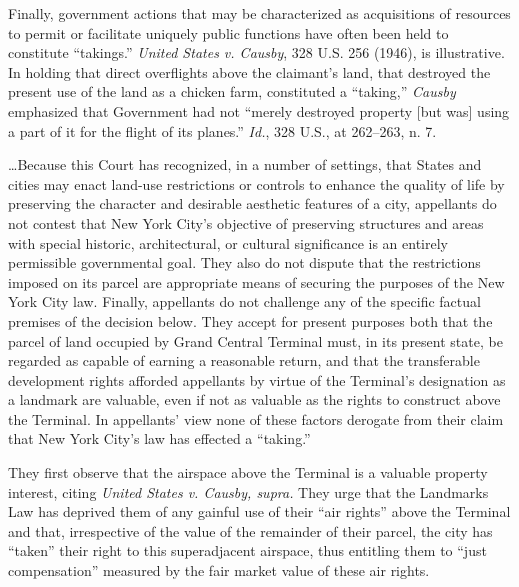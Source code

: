 Finally, government actions that may be characterized as acquisitions of
resources to permit or facilitate uniquely public functions have often been held
to constitute ``takings.'' \textit{United States v. Causby}, 328 U.S. 256
(1946), is illustrative. In holding that direct overflights above the claimant's
land, that destroyed the present use of the land as a chicken farm, constituted
a ``taking,'' \textit{Causby} emphasized that Government had not ``merely
destroyed property [but was] using a part of it for the flight of its planes.''
\textit{Id.}, 328 U.S., at 262--263, n. 7. 



\ldots Because this Court has recognized, in a number of settings, that States
and cities may enact land-use restrictions or controls to enhance the quality of
life by preserving the character and desirable aesthetic features of a city,
appellants do not contest that New York City's objective of preserving
structures and areas with special historic, architectural, or cultural
significance is an entirely permissible governmental goal. They also do not
dispute that the restrictions imposed on its parcel are appropriate means of
securing the purposes of the New York City law. Finally, appellants do not
challenge any of the specific factual premises of the decision below. They
accept for present purposes both that the parcel of land occupied by Grand
Central Terminal must, in its present state, be regarded as capable of earning a
reasonable return, and that the transferable development rights afforded
appellants by virtue of the Terminal's designation as a landmark are valuable,
even if not as valuable as the rights to construct above the Terminal. In
appellants' view none of these factors derogate from their claim that New York
City's law has effected a ``taking.''

They first observe that the airspace above the Terminal is a valuable property
interest, citing \textit{United States v. Causby, supra.} They urge that the
Landmarks Law has deprived them of any gainful use of their ``air rights'' above
the Terminal and that, irrespective of the value of the remainder of their
parcel, the city has ``taken'' their right to this superadjacent airspace, thus
entitling them to ``just compensation'' measured by the fair market value of
these air rights.

